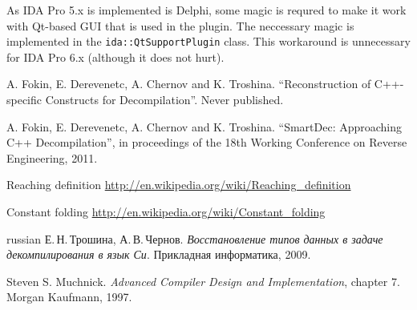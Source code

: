 \documentclass[a4paper,12pt]{article}
\newcommand{\ident}[1]{\texttt{#1}}
\begin{document}
As IDA Pro 5.x is implemented is Delphi, some magic is requred to make it work with Qt-based GUI that is used in the plugin. The neccessary magic is implemented in the \ident{ida::QtSupportPlugin} class.
This workaround is unnecessary for IDA Pro 6.x (although it does not hurt).

\clearpage
{}
\begin{thebibliography}{99}

A. Fokin, E. Derevenetc, A. Chernov and K. Troshina. ``Reconstruction of C++-specific Constructs for Decompilation''. Never published.

A. Fokin, E. Derevenetc, A. Chernov and K. Troshina. ``SmartDec: Approaching C++ Decompilation'', in proceedings of the 18th Working Conference on Reverse Engineering, 2011.

Reaching definition \url{http://en.wikipedia.org/wiki/Reaching_definition}

Constant folding \url{http://en.wikipedia.org/wiki/Constant_folding}

\begin{otherlanguage*}{russian}
Е.\,Н.\,Трошина, А.\,В.\,Чернов. \emph{Восстановление типов данных в задаче декомпилирования в язык Си}. Прикладная информатика, 2009.
\end{otherlanguage*}

Steven S. Muchnick. \emph{Advanced Compiler Design and Implementation}, chapter 7. Morgan Kaufmann, 1997.

\end{thebibliography}
\end{document}
